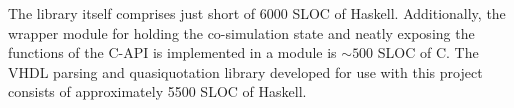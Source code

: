 



The library itself comprises just short of 6000 SLOC of Haskell. Additionally,
the wrapper module for holding the co-simulation state and neatly exposing the
functions of the C-API is implemented in a module is $\sim 500$ SLOC of C. The
VHDL parsing and quasiquotation library developed for use with this project
consists of approximately 5500 SLOC of Haskell.

